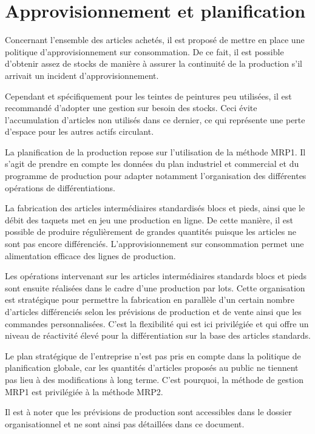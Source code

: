 \section{Approvisionnement et planification}

Concernant l'ensemble des articles achetés, il est proposé de mettre en place
une politique d'approvisionnement sur consommation. De ce fait,
il est possible d'obtenir assez de stocks de manière à assurer la continuité
de la production s'il arrivait un incident d'approvisionnement.

Cependant et spécifiquement pour les teintes de peintures peu utilisées,
il est recommandé d'adopter une gestion sur besoin des stocks.
Ceci évite l'accumulation d'articles non utilisés dans ce dernier, ce qui
représente une perte d'espace pour les autres actifs circulant.

La planification de la production repose sur l'utilisation de la méthode
MRP1. Il s'agit de prendre en compte les données du plan industriel et
commercial et du programme de production pour adapter notamment 
l'organisation des différentes opérations de différentiations.

La fabrication des articles intermédiaires standardisés blocs et pieds, ainsi
que le débit des taquets met en jeu une production en ligne. De cette manière,
il est possible de produire régulièrement de grandes quantités puisque
les articles ne sont pas encore différenciés. L'approvisionnement
sur consommation permet une alimentation efficace des lignes de production.

Les opérations intervenant sur les articles intermédiaires standards blocs et
pieds sont ensuite réalisées dans le cadre d'une production par lots.
Cette organisation est stratégique pour permettre la fabrication en parallèle
d'un certain nombre d'articles différenciés selon les prévisions de
production et de vente ainsi que les commandes personnalisées.
C'est la flexibilité qui est ici privilégiée et qui offre un niveau de
réactivité élevé pour la différentiation sur la base des articles standards.

Le plan stratégique de l'entreprise n'est pas pris en compte dans la politique
de planification globale, car les quantités d'articles proposés au public
ne tiennent pas lieu à des modifications à long terme. C'est pourquoi,
la méthode de gestion MRP1 est privilégiée à la méthode MRP2.

Il est à noter que les prévisions de production sont accessibles 
dans le dossier organisationnel et ne sont ainsi pas détaillées
dans ce document.